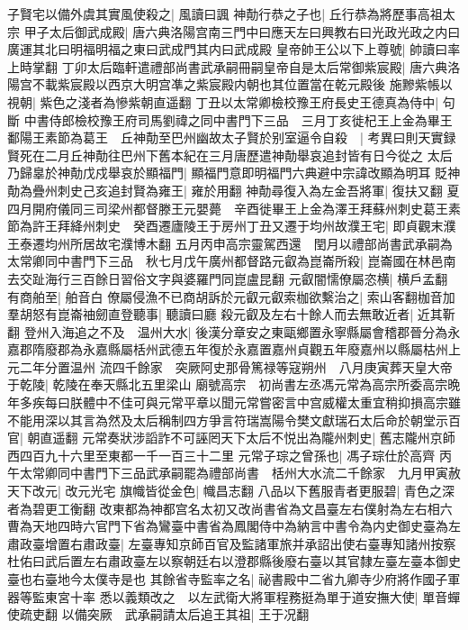 子賢宅以備外虞其實風使殺之|{
	風讀曰諷}
神勣行恭之子也|{
	丘行恭為將歷事高祖太宗}
甲子太后御武成殿|{
	唐六典洛陽宫南三門中曰應天左曰興教右曰光政光政之内曰廣運其北曰明福明福之東曰武成門其内曰武成殿}
皇帝帥王公以下上尊號|{
	帥讀曰率上時掌翻}
丁卯太后臨軒遣禮部尚書武承嗣冊嗣皇帝自是太后常御紫宸殿|{
	唐六典洛陽宫不載紫宸殿以西京大明宫凖之紫宸殿内朝也其位置當在乾元殿後}
施黲紫帳以視朝|{
	紫色之淺者為慘紫朝直遥翻}
丁丑以太常卿檢校豫王府長史王德真為侍中|{
	句斷}
中書侍郎檢校豫王府司馬劉禕之同中書門下三品　三月丁亥徙杞王上金為畢王鄱陽王素節為葛王　丘神勣至巴州幽故太子賢於别室逼令自殺　|{
	考異曰則天實録賢死在二月丘神勣往巴州下舊本紀在三月唐歷遣神勣舉哀追封皆有日今從之}
太后乃歸辠於神勣戊戍舉哀於顯福門|{
	顯福門意即明福門六典避中宗諱改顯為明耳}
貶神勣為疊州刺史己亥追封賢為雍王|{
	雍於用翻}
神勣尋復入為左金吾將軍|{
	復扶又翻}
夏四月開府儀同三司梁州都督滕王元嬰薨　辛酉徙畢王上金為澤王拜蘇州刺史葛王素節為許王拜絳州刺史　癸酉遷廬陵王于房州丁丑又遷于均州故濮王宅|{
	即貞觀末濮王泰遷均州所居故宅濮博木翻}
五月丙申高宗靈駕西還　閏月以禮部尚書武承嗣為太常卿同中書門下三品　秋七月戊午廣州都督路元叡為崑崙所殺|{
	崑崙國在林邑南去交趾海行三百餘日習俗文字與婆羅門同崑盧昆翻}
元叡闇懦僚屬恣横|{
	横戶孟翻}
有商舶至|{
	舶音白}
僚屬侵漁不已商胡訴於元叡元叡索枷欲繫治之|{
	索山客翻枷音加}
羣胡怒有崑崙䄂劒直登聽事|{
	聽讀曰廳}
殺元叡及左右十餘人而去無敢近者|{
	近其靳翻}
登州入海追之不及　温州大水|{
	後漢分章安之東甌鄉置永寧縣屬會稽郡晉分為永嘉郡隋廢郡為永嘉縣屬栝州武德五年復於永嘉置嘉州貞觀五年廢嘉州以縣屬枯州上元二年分置温州}
流四千餘家　突厥阿史那骨篤禄等寇朔州　八月庚寅葬天皇大帝于乾陵|{
	乾陵在奉天縣北五里梁山}
廟號高宗　初尚書左丞馮元常為高宗所委高宗晩年多疾每曰朕體中不佳可與元常平章以聞元常嘗密言中宫威權太重宜稍抑損高宗雖不能用深以其言為然及太后稱制四方爭言符瑞嵩陽令樊文獻瑞石太后命於朝堂示百官|{
	朝直遥翻}
元常奏狀涉謟詐不可誣罔天下太后不悦出為隴州刺史|{
	舊志隴州京師西四百九十六里至東都一千一百三十二里}
元常子琮之曾孫也|{
	馮子琮仕於高齊}
丙午太常卿同中書門下三品武承嗣罷為禮部尚書　栝州大水流二千餘家　九月甲寅赦天下改元|{
	改元光宅}
旗幟皆從金色|{
	幟昌志翻}
八品以下舊服青者更服碧|{
	青色之深者為碧更工衡翻}
改東都為神都宫名太初又改尚書省為文昌臺左右僕射為左右相六曹為天地四時六官門下省為鸞臺中書省為鳳閣侍中為納言中書令為内史御史臺為左肅政臺增置右肅政臺|{
	左臺專知京師百官及監諸軍旅并承詔出使右臺專知諸州按察杜佑曰武后置左右肅政臺左以察朝廷右以澄郡縣後廢右臺以其官隸左臺左臺本御史臺也右臺地今太僕寺是也}
其餘省寺監率之名|{
	祕書殿中二省九卿寺少府將作國子軍器等監東宮十率}
悉以義類改之　以左武衛大將軍程務挺為單于道安撫大使|{
	單音蟬使疏吏翻}
以備突厥　武承嗣請太后追王其祖|{
	王于况翻}
